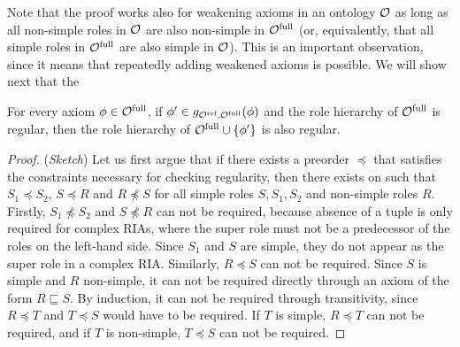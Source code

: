 \documentclass[
]{ceurart}
\begin{document}
Note that the proof works also for weakening axioms in an ontology $\mathcal{O}$ as long as all non-simple roles in $\mathcal{O}$ are also non-simple in ${\mathcal{O}^\textnormal{full}}$ (or, equivalently, that all simple roles in ${\mathcal{O}^\textnormal{full}}$ are also simple in $\mathcal{O}$). This is an important observation, since it means that repeatedly adding weakened axioms is possible. We will show next that the 

\begin{lemma} \label{lem:regularity}
  For every axiom $\phi \in {\mathcal{O}^\textnormal{full}}$, if $\phi' \in g_{{\mathcal{O}^\textnormal{ref}},{\mathcal{O}^\textnormal{full}}}(\phi)$ and the role hierarchy of ${\mathcal{O}^\textnormal{full}}$ is regular, then the role hierarchy of ${\mathcal{O}^\textnormal{full}} \cup \{ \phi' \}$ is also regular.
\end{lemma}

\begin{proof}(\emph{Sketch}) \label{proof:regularity}
  Let us first argue that if there exists a preorder $\preceq$ that satisfies the constraints necessary for checking regularity, then there exists on such that $S_1 \preceq S_2$, $S \preceq R$ and $R \not\preceq S$ for all simple roles $S, S_1, S_2$ and non-simple roles $R$. Firstly, $S_1 \not\preceq S_2$ and $S \not\preceq R$ can not be required, because absence of a tuple is only required for complex RIAs, where the super role must not be a predecessor of the roles on the left-hand side. Since $S_1$ and $S$ are simple, they do not appear as the super role in a complex RIA. Similarly, $R \preceq S$ can not be required. Since $S$ is simple and $R$ non-simple, it can not be required directly through an axiom of the form $R \sqsubseteq S$. By induction, it can not be required through transitivity, since $R \preceq T$ and $T \preceq S$ would have to be required. If $T$ is simple, $R \preceq T$ can not be required, and if $T$ is non-simple, $T \preceq S$ can not be required.


\end{proof}
\end{document}
